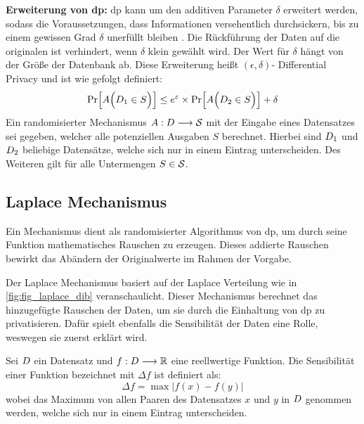 \textbf{Erweiterung von \gls{dp}: }
\gls{dp} kann um den additiven Parameter $\delta$ erweitert werden, sodass die Voraussetzungen, dass Informationen versehentlich durchsickern, bis zu einem gewissen Grad $\delta$ unerfüllt bleiben \parencite{Seminar2017}. Die Rückführung der Daten auf die originalen ist verhindert, wenn $\delta$ klein gewählt wird. Der Wert für $\delta$ hängt von der Größe der Datenbank ab. Diese Erweiterung heißt $(\epsilon,\delta)$- Differential Privacy und ist wie gefolgt definiert:
\begin{equation*}
	\Pr\Bigl[ A\Bigl( D_{1} \in S \Bigr) \Bigr]\leq  e^{\varepsilon} \times \Pr\Bigl[ A\Bigl( D_{2} \in S \Bigr) \Bigr] + \delta
\end{equation*}
Ein randomisierter Mechanismus $A : D\longrightarrow\mathcal{S}$ mit der Eingabe eines Datensatzes sei gegeben, welcher alle potenziellen Ausgaben $S$ berechnet. Hierbei sind $D_{1}$ und  $D_{2}$ beliebige Datensätze, welche sich nur in einem Eintrag unterscheiden. Des Weiteren gilt für alle Untermengen $S \in \mathcal{S}$.

\subsection{Laplace Mechanismus}
Ein Mechanismus dient als randomisierter Algorithmus von \gls{dp}, um durch seine Funktion mathematisches Rauschen zu erzeugen. Dieses addierte Rauschen bewirkt das Abändern der Originalwerte im Rahmen der Vorgabe.

Der Laplace Mechanismus basiert auf der Laplace Verteilung wie in \cref{fig:fig_laplace_dib} veranschaulicht. Dieser Mechanismus berechnet das hinzugefügte Rauschen der Daten, um sie durch die Einhaltung von \gls{dp} zu privatisieren. Dafür spielt ebenfalls die Sensibilität \parencite{Seminar2017} der Daten eine Rolle, weswegen sie zuerst erklärt wird.

Sei $D$ ein Datensatz und $f: D \longrightarrow \mathbb{R}$ eine reellwertige Funktion. Die Sensibilität einer Funktion bezeichnet mit $\Delta f$ ist definiert als: 
\begin{equation*}
	\Delta f = \max |f(x) - f(y)|
\end{equation*}\parencite{AlgoFoundations2014}
wobei das Maximum von allen Paaren des Datensatzes $x$ und $y$ in $D$ genommen werden, welche sich nur in einem Eintrag unterscheiden.

